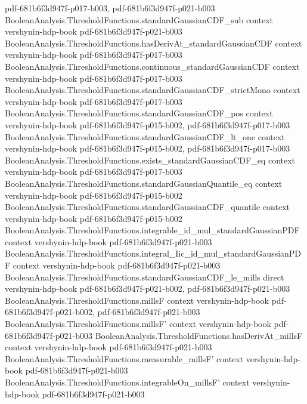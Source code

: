 \begin{lemma}
  {pdf-681b6f3d947f-p017-b003,
    pdf-681b6f3d947f-p021-b003}
\proofstep
  {BooleanAnalysis.ThresholdFunctions.standardGaussianCDF_sub}
  {context}
  {vershynin-hdp-book}
  {pdf-681b6f3d947f-p021-b003}
\proofstep
  {BooleanAnalysis.ThresholdFunctions.hasDerivAt_standardGaussianCDF}
  {context}
  {vershynin-hdp-book}
  {pdf-681b6f3d947f-p017-b003}
\proofstep
  {BooleanAnalysis.ThresholdFunctions.continuous_standardGaussianCDF}
  {context}
  {vershynin-hdp-book}
  {pdf-681b6f3d947f-p017-b003}
\proofstep
  {BooleanAnalysis.ThresholdFunctions.standardGaussianCDF_strictMono}
  {context}
  {vershynin-hdp-book}
  {pdf-681b6f3d947f-p017-b003}
\proofstep
  {BooleanAnalysis.ThresholdFunctions.standardGaussianCDF_pos}
  {context}
  {vershynin-hdp-book}
  {pdf-681b6f3d947f-p015-b002,
    pdf-681b6f3d947f-p017-b003}
\proofstep
  {BooleanAnalysis.ThresholdFunctions.standardGaussianCDF_lt_one}
  {context}
  {vershynin-hdp-book}
  {pdf-681b6f3d947f-p015-b002,
    pdf-681b6f3d947f-p017-b003}
\proofstep
  {BooleanAnalysis.ThresholdFunctions.exists_standardGaussianCDF_eq}
  {context}
  {vershynin-hdp-book}
  {pdf-681b6f3d947f-p017-b003}
\proofstep
  {BooleanAnalysis.ThresholdFunctions.standardGaussianQuantile_eq}
  {context}
  {vershynin-hdp-book}
  {pdf-681b6f3d947f-p015-b002}
\proofstep
  {BooleanAnalysis.ThresholdFunctions.standardGaussianCDF_quantile}
  {context}
  {vershynin-hdp-book}
  {pdf-681b6f3d947f-p015-b002}
\proofstep
  {BooleanAnalysis.ThresholdFunctions.integrable_id_mul_standardGaussianPDF}
  {context}
  {vershynin-hdp-book}
  {pdf-681b6f3d947f-p021-b003}
\proofstep
  {BooleanAnalysis.ThresholdFunctions.integral_Iic_id_mul_standardGaussianPDF}
  {context}
  {vershynin-hdp-book}
  {pdf-681b6f3d947f-p021-b003}
\proofstep
  {BooleanAnalysis.ThresholdFunctions.standardGaussianCDF_le_mills}
  {direct}
  {vershynin-hdp-book}
  {pdf-681b6f3d947f-p021-b002,
    pdf-681b6f3d947f-p021-b003}
\proofstep
  {BooleanAnalysis.ThresholdFunctions.millsF}
  {context}
  {vershynin-hdp-book}
  {pdf-681b6f3d947f-p021-b002,
    pdf-681b6f3d947f-p021-b003}
\proofstep
  {BooleanAnalysis.ThresholdFunctions.millsF'}
  {context}
  {vershynin-hdp-book}
  {pdf-681b6f3d947f-p021-b003}
\proofstep
  {BooleanAnalysis.ThresholdFunctions.hasDerivAt_millsF}
  {context}
  {vershynin-hdp-book}
  {pdf-681b6f3d947f-p021-b003}
\proofstep
  {BooleanAnalysis.ThresholdFunctions.measurable_millsF'}
  {context}
  {vershynin-hdp-book}
  {pdf-681b6f3d947f-p021-b003}
\proofstep
  {BooleanAnalysis.ThresholdFunctions.integrableOn_millsF'}
  {context}
  {vershynin-hdp-book}
  {pdf-681b6f3d947f-p021-b003}
\proofstep

\end{lemma}
